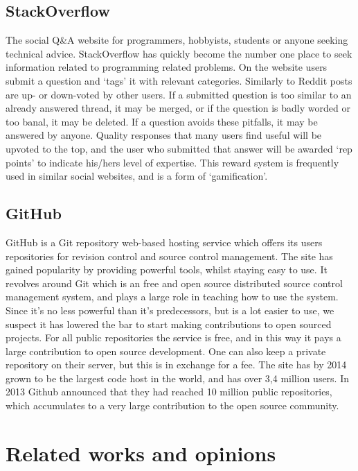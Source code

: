 \documentclass[a4paper,11pt]{article} %
\begin{document}
\subsection{StackOverflow}

The social Q\&A website for programmers, hobbyists, students or anyone
seeking technical advice. StackOverflow has quickly become the number one
place to seek information related to programming related problems. On the
website users submit a question and ‘tags’ it with relevant categories.
Similarly to Reddit posts are up- or down-voted by other users. If a
submitted question is too similar to an already answered thread, it may be
merged, or if the question is badly worded or too banal, it may be
deleted. If a question avoids these pitfalls, it may be answered by
anyone. Quality responses that many users find useful will be upvoted to the
top, and the user who submitted that answer will be awarded ‘rep points’ to
indicate his/hers level of expertise. This reward system is frequently used
in similar social websites, and is a form of ‘gamification’.

\subsection{GitHub}

GitHub is a Git repository web-based 
hosting service which offers its users
repositories for revision control and source control management. The site
has gained popularity by providing powerful tools, whilst staying easy to
use. It revolves around Git which is an free and open source distributed
source control management system, and plays a large role in teaching how to
use the system. Since it’s no less powerful than it’s predecessors, but is a
lot easier to use, we suspect it has lowered the bar to start making
contributions to open sourced projects. For all public repositories the
service is free, and in this way it pays a large contribution to open source
development. One can also keep a private repository on their server, but
this is in exchange for a fee. The site has by 2014 grown to be the largest
code host in the world, and has over 3,4 million users. In 2013 Github
announced that they had reached 10 million public repositories, which
accumulates to a very large contribution to the open source community.

\section{Related works and opinions}
\end{document}
